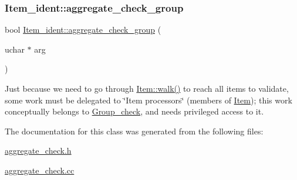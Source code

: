 \subsubsection{\texorpdfstring{Item\+\_\+ident\+::aggregate\+\_\+check\+\_\+group}{Item\_ident::aggregate\_check\_group}}
{\footnotesize\ttfamily bool \mbox{\hyperlink{classItem__ident_ae79407fb0ebd076c5a45f16f36512724}{Item\+\_\+ident\+::aggregate\+\_\+check\+\_\+group}} (\begin{DoxyParamCaption}\item[{uchar $\ast$}]{arg }\end{DoxyParamCaption})\hspace{0.3cm}{\ttfamily [friend]}}

Just because we need to go through \mbox{\hyperlink{classItem_ab7d2529511c14a77e59a1b1bbabc95d7}{Item\+::walk()}} to reach all items to validate, some work must be delegated to \char`\"{}\+Item processors\char`\"{} (members of \mbox{\hyperlink{classItem}{Item}}); this work conceptually belongs to \mbox{\hyperlink{classGroup__check}{Group\+\_\+check}}, and needs privileged access to it. 

The documentation for this class was generated from the following files\+:\begin{DoxyCompactItemize}
\item 
\mbox{\hyperlink{aggregate__check_8h}{aggregate\+\_\+check.\+h}}\item 
\mbox{\hyperlink{aggregate__check_8cc}{aggregate\+\_\+check.\+cc}}\end{DoxyCompactItemize}
